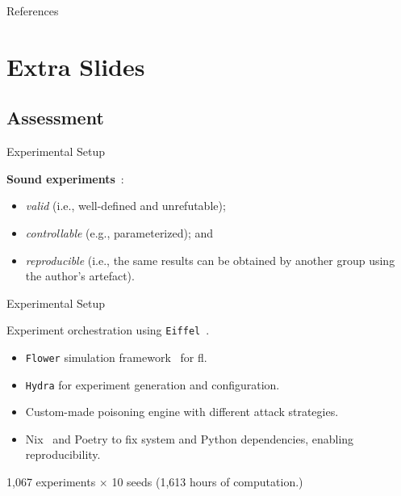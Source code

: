 
\appendix

\begin{frame}[allowframebreaks]{References}
  \printbibliography[heading=none]
\end{frame}

\section*{Extra Slides}
\subsection*{Assessment}

\begin{frame}
  \sectionpage
\end{frame}

\begin{frame}{Experimental Setup}

  \textbf{Sound experiments}~\cite{uetz_ReproducibleAdaptableLog_2021,ACM_artifacts}:
  \begin{itemize}
    \item \emph{valid} (i.e., well-defined and unrefutable);
    \item \emph{controllable} (e.g., parameterized); and
    \item \emph{reproducible} (i.e., the same results can be obtained by another group using the author’s artefact).
  \end{itemize}

\end{frame}

\begin{frame}{Experimental Setup}
    
  Experiment orchestration using \texttt{Eiffel}~\cite{lavaur_icdcs_demo_2024}.
  \begin{itemize}
      \item \texttt{Flower} simulation framework~\cite{beutel_Flowerfriendlyfederated_2020} for \gls{fl}.
      \item \texttt{Hydra} for experiment generation and configuration.
      \item Custom-made poisoning engine with different attack strategies.
      \item Nix~\cite{dolstra_purelyfunctionalsoftware_2006} and Poetry to fix system and Python dependencies, enabling reproducibility.
  \end{itemize}

  1,067 experiments $\times$ 10 seeds (1,613 hours of computation.)
\end{frame}


